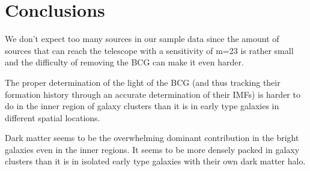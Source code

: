 \chapter{Conclusions}

We don't expect too many sources in our sample data since the amount of sources that can reach the telescope with a sensitivity of m=23 is rather small and the difficulty of removing the BCG can make it even harder.

The proper determination of the light of the BCG (and thus tracking their formation history through an accurate determination of their IMFs) is harder to do in the inner region of galaxy clusters than it is in early type galaxies in different spatial locations. 

Dark matter seems to be the overwhelming dominant contribution in the bright galaxies even in the inner regions. It seems to be more densely packed in galaxy clusters than it is in isolated early type galaxies with their own dark matter halo.

